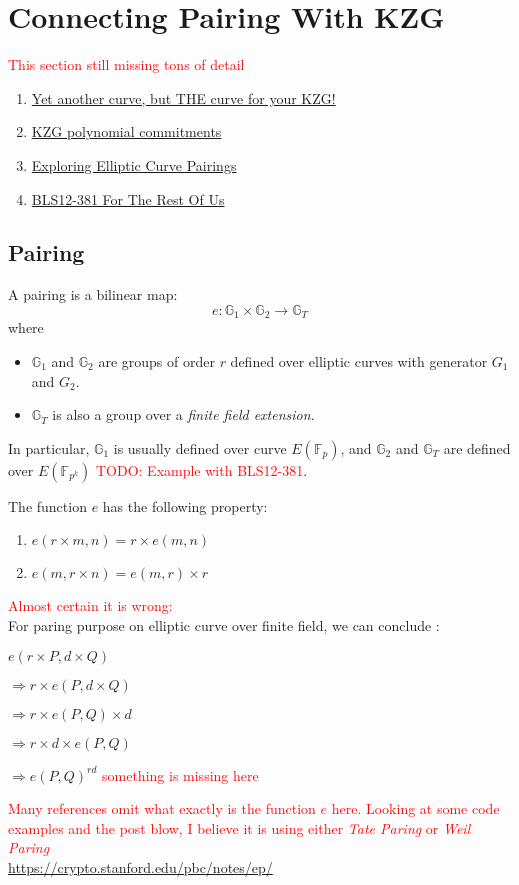 \documentclass[10pt]{article}
\newcommand{\FField}{\mathbb{F}_p}
\newcommand{\HL}[1]{\textcolor{red}{#1}}
\begin{document}
\section{Connecting Pairing With KZG}
\HL{This section still missing tons of detail}
\begin{enumerate}
    \item \href{https://hackmd.io/@gnark/kzg-bls24}{Yet another curve, but THE
            curve for your KZG!}
    \item
            \href{https://dankradfeist.de/ethereum/2020/06/16/kate-polynomial-commitments.html}{KZG
            polynomial commitments}
        \item \href{https://vitalik.ca/general/2017/01/14/exploring_ecp.html}{Exploring Elliptic Curve Pairings }
        \item \href{https://hackmd.io/@benjaminion/bls12-381}{BLS12-381 For The Rest Of Us}
\end{enumerate}

\subsection{Pairing}
A pairing is a bilinear map:
\[
    e: \mathbb{G}_1 \times \mathbb{G}_2 \rightarrow \mathbb{G}_T
\]
where
\begin{itemize}
    \item $\mathbb{G}_1$ and $\mathbb{G}_2$ are groups of order $r$ defined
        over elliptic curves with generator $G_1$ and $G_2$. 
    \item $\mathbb{G}_T$ is also a group over a \emph{finite field extension}.
\end{itemize}
In particular, $\mathbb{G}_1$ is usually defined over curve $E(\FField)$, and
$\mathbb{G}_2$ and $\mathbb{G}_T$ are defined over $E(\mathbb{F}_{p^k})$
\HL{TODO: Example with BLS12-381}.

The function $e$ has the following property:
\begin{enumerate}
    \item $e(r \times m, n) = r \times e(m, n)$
    \item $e(m, r \times n) = e(m, r) \times r$
\end{enumerate}

\HL{Almost certain it is wrong:}\\
For paring purpose on elliptic curve over finite field, we can conclude :
\begin{description}
    \item $e(r \times P, d \times Q)$
    \item $\Longrightarrow r \times e(P, d \times Q)$
    \item $\Longrightarrow r \times e(P, Q) \times d$
    \item $\Longrightarrow r \times d \times e(P, Q)$
    \item $\Longrightarrow e(P, Q)^{rd}$ \HL{something is missing here}
\end{description}
\HL{Many references omit what exactly is the function $e$ here. Looking at
some code examples and the post blow, I believe it is using either \emph{Tate Paring} or \emph{Weil Paring}}\\
\href{References}{https://crypto.stanford.edu/pbc/notes/ep/}
\end{document}
